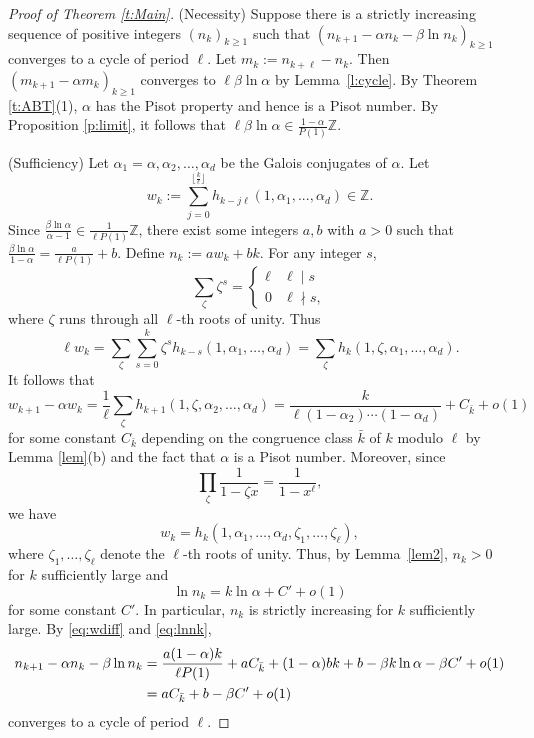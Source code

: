 \documentclass[12pt,centertags,oneside]{amsart}
\theoremstyle{definition}
\newcommand{\Z}{\mathbb{Z}}
\begin{document}
\begin{proof}[Proof of Theorem \ref{t:Main}]
(Necessity) Suppose there is a strictly increasing sequence of positive 
integers $(n_k)_{k\geqslant 1}$ such that $(n_{k+1}-\alpha n_k-\beta\ln 
n_k)_{k\geqslant 1}$ converges to a cycle of period $\ell$. Let 
$m_k:=n_{k+\ell}-n_k$. Then $(m_{k+1}-\alpha m_k)_{k\geqslant 1}$ converges 
to $\ell \beta\ln\alpha$ by Lemma~\ref{l:cycle}. By Theorem \ref{t:ABT}(1), 
$\alpha$ has the Pisot property and hence is a Pisot number. By Proposition 
\ref{p:limit}, it follows that $\ell \beta\ln\alpha\in 
\frac{1-\alpha}{P(1)}\Z$. 

(Sufficiency) Let $\alpha_1=\alpha,\alpha_2,\dots,\alpha_d$ be the Galois 
conjugates of $\alpha$. Let 
\[
w_k:=\sum_{j=0}^{\lfloor\frac{k}{\ell}\rfloor} h_{k-j\ell}(1,\alpha_1,...,\alpha_d)\in\mathbb{Z}.
\]
Since $\frac{\beta\ln\alpha}{\alpha-1}\in\frac{1}{\ell P(1)}\mathbb{Z}$, 
there exist some integers $a,b$ with $a>0$ such that 
$\frac{\beta\ln\alpha}{1-\alpha}=\frac{a}{\ell P(1)}+b$. Define 
$n_k:=aw_k+bk$. For any integer $s$, 
\[\sum_\zeta \zeta^s =\begin{cases}
\ell & \ell\mid s\\
0 & \ell\nmid s,
\end{cases}\] 
where $\zeta$ runs through all $\ell$-th roots of unity. Thus
\[\ell w_k=\sum_{\zeta}\sum_{s=0}^k \zeta^s h_{k-s}(1,\alpha_1,\dots,\alpha_d)=\sum_{\zeta} h_{k}(1,\zeta,\alpha_1,\dots,\alpha_d).\]
It follows that
\begin{equation}\label{eq:wdiff}
w_{k+1}-\alpha w_{k}=\frac{1}{\ell}\sum_\zeta h_{k+1}(1,\zeta,\alpha_2,\dots,\alpha_d)=\frac{k}{\ell(1-\alpha_2)\dotsm(1-\alpha_d)}+C_{\bar k}+o(1)
\end{equation}
for some constant $C_{\bar k}$ depending on the congruence class $\bar k$ 
of $k$ modulo $\ell$ by Lemma \ref{lem}(b) and the fact that $\alpha$ is a 
Pisot number. Moreover, since 
\[\prod_\zeta \frac{1}{1-\zeta x}=\frac{1}{1-x^\ell},\]
we have
\[w_k=h_k(1,\alpha_1,\dots,\alpha_d,\zeta_1,\dots,\zeta_\ell),\]
where $\zeta_1,\dots,\zeta_\ell$ denote the $\ell$-th roots of unity. Thus, 
by Lemma~\ref{lem2}, $n_k>0$ for $k$ sufficiently large and 
\begin{equation}\label{eq:lnnk}
\ln n_k = k\ln \alpha + C'+o(1)
\end{equation}
for some constant $C'$. In particular, $n_k$ is strictly increasing for $k$ 
sufficiently large. By \eqref{eq:wdiff} and \eqref{eq:lnnk}, 
\[
\aligned
n_{k+1}-\alpha n_k -\beta\ln n_k
&=\frac{a(1-\alpha)k}{\ell P(1)}+a C_{\bar k}+(1-\alpha) b k+b-\beta k\ln \alpha -\beta C'+o(1)\\
&=a C_{\bar k}+b-\beta C'+o(1)
\endaligned
\]
converges to a cycle of period $\ell$.
\end{proof}
\end{document}
